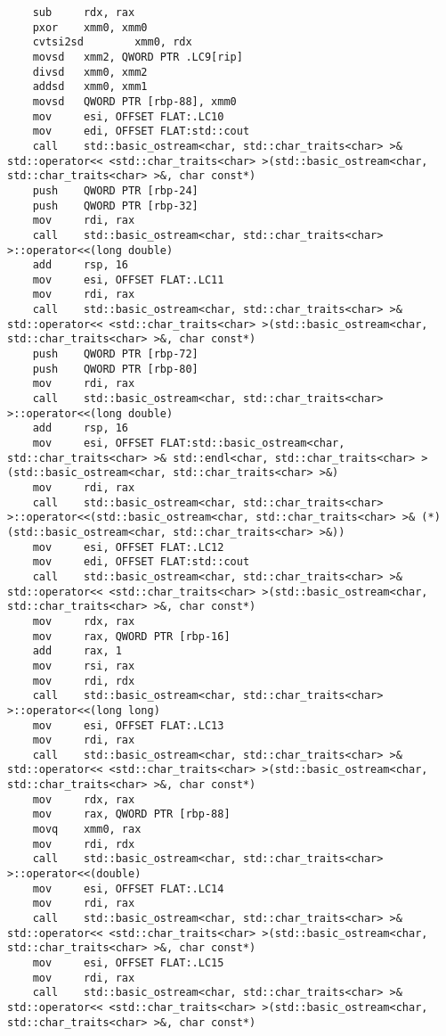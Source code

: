 \documentclass[12pt,a4paper]{article}
\numberwithin{subsection}{section}
\begin{document}
\begin{lstlisting}
    sub     rdx, rax
    pxor    xmm0, xmm0
    cvtsi2sd        xmm0, rdx
    movsd   xmm2, QWORD PTR .LC9[rip]
    divsd   xmm0, xmm2
    addsd   xmm0, xmm1
    movsd   QWORD PTR [rbp-88], xmm0
    mov     esi, OFFSET FLAT:.LC10
    mov     edi, OFFSET FLAT:std::cout
    call    std::basic_ostream<char, std::char_traits<char> >& std::operator<< <std::char_traits<char> >(std::basic_ostream<char, std::char_traits<char> >&, char const*)
    push    QWORD PTR [rbp-24]
    push    QWORD PTR [rbp-32]
    mov     rdi, rax
    call    std::basic_ostream<char, std::char_traits<char> >::operator<<(long double)
    add     rsp, 16
    mov     esi, OFFSET FLAT:.LC11
    mov     rdi, rax
    call    std::basic_ostream<char, std::char_traits<char> >& std::operator<< <std::char_traits<char> >(std::basic_ostream<char, std::char_traits<char> >&, char const*)
    push    QWORD PTR [rbp-72]
    push    QWORD PTR [rbp-80]
    mov     rdi, rax
    call    std::basic_ostream<char, std::char_traits<char> >::operator<<(long double)
    add     rsp, 16
    mov     esi, OFFSET FLAT:std::basic_ostream<char, std::char_traits<char> >& std::endl<char, std::char_traits<char> >(std::basic_ostream<char, std::char_traits<char> >&)
    mov     rdi, rax
    call    std::basic_ostream<char, std::char_traits<char> >::operator<<(std::basic_ostream<char, std::char_traits<char> >& (*)(std::basic_ostream<char, std::char_traits<char> >&))
    mov     esi, OFFSET FLAT:.LC12
    mov     edi, OFFSET FLAT:std::cout
    call    std::basic_ostream<char, std::char_traits<char> >& std::operator<< <std::char_traits<char> >(std::basic_ostream<char, std::char_traits<char> >&, char const*)
    mov     rdx, rax
    mov     rax, QWORD PTR [rbp-16]
    add     rax, 1
    mov     rsi, rax
    mov     rdi, rdx
    call    std::basic_ostream<char, std::char_traits<char> >::operator<<(long long)
    mov     esi, OFFSET FLAT:.LC13
    mov     rdi, rax
    call    std::basic_ostream<char, std::char_traits<char> >& std::operator<< <std::char_traits<char> >(std::basic_ostream<char, std::char_traits<char> >&, char const*)
    mov     rdx, rax
    mov     rax, QWORD PTR [rbp-88]
    movq    xmm0, rax
    mov     rdi, rdx
    call    std::basic_ostream<char, std::char_traits<char> >::operator<<(double)
    mov     esi, OFFSET FLAT:.LC14
    mov     rdi, rax
    call    std::basic_ostream<char, std::char_traits<char> >& std::operator<< <std::char_traits<char> >(std::basic_ostream<char, std::char_traits<char> >&, char const*)
    mov     esi, OFFSET FLAT:.LC15
    mov     rdi, rax
    call    std::basic_ostream<char, std::char_traits<char> >& std::operator<< <std::char_traits<char> >(std::basic_ostream<char, std::char_traits<char> >&, char const*)

\end{lstlisting}
\end{document}
